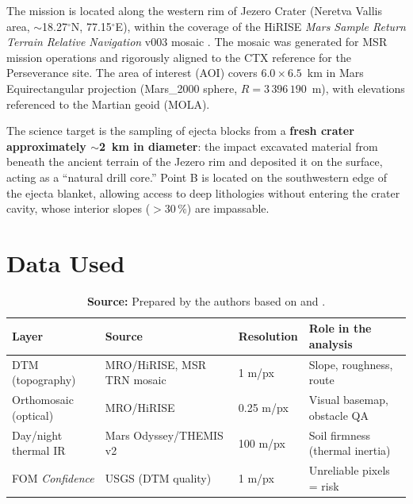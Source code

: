 \documentclass{article}
\begin{document}
The mission is located along the western rim of Jezero Crater (Neretva Vallis area, $\sim$18.27$^{\circ}$N, 77.15$^{\circ}$E), within the coverage of the HiRISE \emph{Mars Sample Return Terrain Relative Navigation} v003 mosaic \citep{usgs2024}. The mosaic was generated for MSR mission operations and rigorously aligned to the CTX reference for the Perseverance site. The area of interest (AOI) covers $6.0 \times 6.5$~km in Mars Equirectangular projection (Mars\_2000 sphere, $R = 3\,396\,190$~m), with elevations referenced to the Martian geoid (MOLA).

The science target is the sampling of ejecta blocks from a \textbf{fresh crater approximately $\sim$2~km in diameter}: the impact excavated material from beneath the ancient terrain of the Jezero rim and deposited it on the surface, acting as a ``natural drill core.'' Point B is located on the southwestern edge of the ejecta blanket, allowing access to deep lithologies without entering the crater cavity, whose interior slopes ($>30\,\%$) are impassable.

\newpage

\section{Data Used}

\begin{table}[H]
\centering
\caption{Data layers integrated into the analysis (four data types, three instruments).}
\label{tab:datos}
\small
\begin{tabular}{p{3.6cm} p{5.2cm} p{2.2cm} p{4.2cm}}
\toprule
\textbf{Layer} & \textbf{Source} & \textbf{Resolution} & \textbf{Role in the analysis} \\
\midrule
DTM (topography) & MRO/HiRISE, MSR TRN mosaic & 1 m/px & Slope, roughness, route \\
Orthomosaic (optical) & MRO/HiRISE & 0.25 m/px & Visual basemap, obstacle QA \\
Day/night thermal IR & Mars Odyssey/THEMIS v2 & 100 m/px & Soil firmness (thermal inertia) \\
FOM \emph{Confidence} & USGS (DTM quality) & 1 m/px & Unreliable pixels = risk \\
\bottomrule
\end{tabular}
\caption*{\textbf{Source:} Prepared by the authors based on \citet{usgs2024} and \citet{usgs2018}.}
\end{table}
\end{document}
